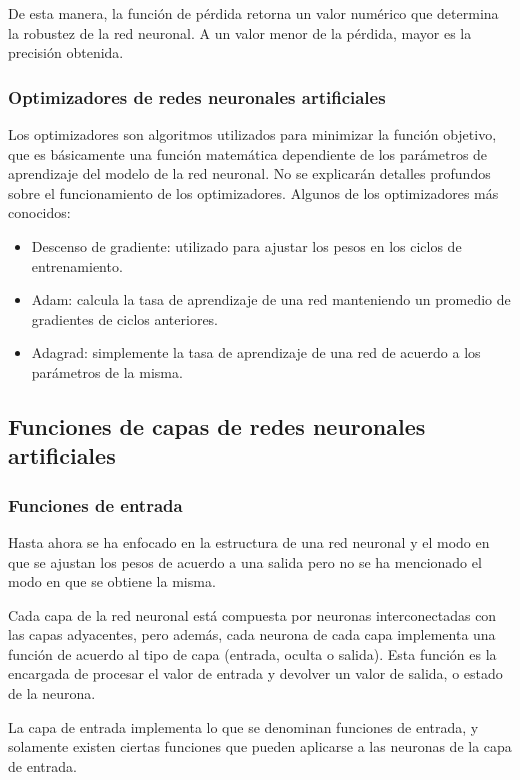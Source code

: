 \documentclass[a4paper,12pt,oneside,spanish]{book}
\begin{document}
De esta manera, la función de pérdida retorna un valor numérico que determina la robustez de la red neuronal. A un valor menor de la pérdida, mayor es la precisión obtenida.\par

\subsubsection{Optimizadores de redes neuronales artificiales}
Los optimizadores son algoritmos utilizados para minimizar la función objetivo, que es básicamente una función matemática dependiente de los parámetros de aprendizaje del modelo de la red neuronal. No se explicarán detalles profundos sobre el funcionamiento de los optimizadores. Algunos de los optimizadores más conocidos:

\begin{itemize}
	\item Descenso de gradiente: utilizado para ajustar los pesos en los ciclos de entrenamiento.
	\item Adam: calcula la tasa de aprendizaje de una red manteniendo un promedio de gradientes de ciclos anteriores.
	\item Adagrad: simplemente la tasa de aprendizaje de una red de acuerdo a los parámetros de la misma.
\end{itemize}

\subsection{Funciones de capas de redes neuronales artificiales}

\subsubsection{Funciones de entrada}
Hasta ahora se ha enfocado en la estructura de una red neuronal y el modo en que se ajustan los pesos de acuerdo a una salida pero no se ha mencionado el modo en que se obtiene la misma.\par

Cada capa de la red neuronal está compuesta por neuronas interconectadas con las capas adyacentes, pero además, cada neurona de cada capa implementa una función de acuerdo al tipo de capa (entrada, oculta o salida). Esta función es la encargada de procesar el valor de entrada y devolver un valor de salida, o estado de la neurona.\par

La capa de entrada implementa lo que se denominan funciones de entrada, y solamente existen ciertas funciones que pueden aplicarse a las neuronas de la capa de entrada.\par 
\end{document}
